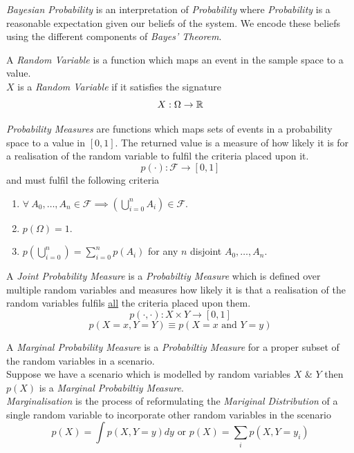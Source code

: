 \documentclass[11pt,a4paper]{article}
\begin{document}
\textit{Bayesian Probability} is an interpretation of \textit{Probability} where \textit{Probability} is a reasonable expectation given our beliefs of the system. We encode these beliefs using the different components of \textit{Bayes' Theorem}.\\


A \textit{Random Variable} is a function which maps an event in the sample space to a value.\\ $X$ is a \textit{Random Variable} if it satisfies the signature
$$X:\Omega\to\mathbb{R}$$

\textit{Probability Measures} are functions which maps sets of events in a probability space to a value in $[0,1]$. The returned value is a measure of how likely it is for a realisation of the random variable to fulfil the criteria placed upon it.
$$p(\cdot):\mathcal{F}\to[0,1]$$
and must fulfil the following criteria
\begin{enumerate}
	\item $\forall\ A_0,\dots,A_n\in\mathcal{F}\implies\left(\bigcup\limits_{i=0}^nA_i\right)\in\mathcal{F}$.
	\item $p(\Omega)=1$.
	\item $p\left(\bigcup\limits_{i=0}^n\right)=\sum\limits_{i=0}^np(A_i)$ for any $n$ disjoint $A_0,\dots,A_n$.
\end{enumerate}

A \textit{Joint Probability Measure} is a \textit{Probabiltiy Measure} which is defined over multiple random variables and measures how likely it is that a realisation of the random variables fulfils \underline{all} the criteria placed upon them.
$$p(\cdot,\cdot):X\times Y\to[0,1]$$
$$p(X=x,Y=Y)\equiv p(X=x\text{ and }Y=y)$$

A \textit{Marginal Probability Measure} is a \textit{Probabiltiy Measure} for a proper subset of the random variables in a scenario.\\
Suppose we have a scenario which is modelled by random variables $X$ \& $Y$ then $p(X)$ is a \textit{Marginal Probabiltiy Measure}.\\
\textit{Marginalisation} is the process of reformulating the \textit{Mariginal Distribution} of a single random variable to incorporate other random variables in the scenario
$$p(X)=\int p(X,Y=y)dy\text{ or }p(X)=\sum_i p(X,Y=y_i)$$
\end{document}
